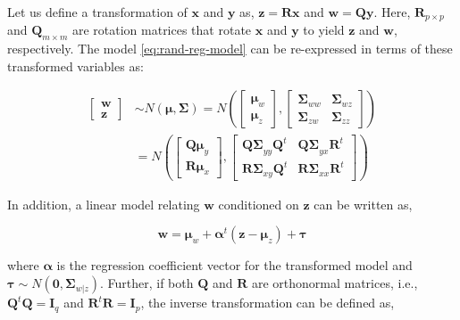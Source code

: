 \documentclass[review]{elsarticle}
\theoremstyle{definition}
\theoremstyle{definition}
\theoremstyle{definition}
\theoremstyle{remark}
\begin{document}
Let us define a transformation of \(\mathbf{x}\) and \(\mathbf{y}\) as,
\(\mathbf{z} = \mathbf{Rx}\) and \(\mathbf{w} = \mathbf{Qy}\). Here,
\(\mathbf{R}_{p\times p}\) and \(\mathbf{Q}_{m\times m}\) are rotation
matrices that rotate \(\mathbf{x}\) and \(\mathbf{y}\) to yield
\(\mathbf{z}\) and \(\mathbf{w}\), respectively. The model
\eqref{eq:rand-reg-model} can be re-expressed in terms of these
transformed variables as:

\begin{align}
  \begin{bmatrix}\mathbf{w} \\
  \mathbf{z}\end{bmatrix}  & \sim N \left(\boldsymbol{\mu}, \boldsymbol{\Sigma}\right)
  = N \left(
    \begin{bmatrix}
      \boldsymbol{\mu}_w \\ \boldsymbol{\mu}_z
    \end{bmatrix},
    \begin{bmatrix}
      \boldsymbol{\Sigma}_{ww} & \boldsymbol{\Sigma}_{wz} \\
      \boldsymbol{\Sigma}_{zw} & \boldsymbol{\Sigma}_{zz}
    \end{bmatrix} \right) \nonumber \\
  &= N \left(
    \begin{bmatrix}
      \boldsymbol{Q\mu}_y \\
      \boldsymbol{R\mu}_x
    \end{bmatrix},
    \begin{bmatrix}
      \boldsymbol{Q\Sigma}_{yy}\boldsymbol{Q}^t & \boldsymbol{Q\Sigma}_{yx}\mathbf{R}^t \\
      \boldsymbol{R\Sigma}_{xy}\boldsymbol{Q}^t & \boldsymbol{R\Sigma}_{xx}\mathbf{R}^t
    \end{bmatrix}
  \right)
  \label{eq:model3}
\end{align}

In addition, a linear model relating \(\mathbf{w}\) conditioned on
\(\mathbf{z}\) can be written as,

\begin{equation}
\mathbf{w} =  \boldsymbol{\mu}_w + \boldsymbol{\alpha}^t \left(\mathbf{z} - \boldsymbol{\mu}_z\right) + \boldsymbol{\tau}
\label{eq:latent-model}
\end{equation}

where \(\boldsymbol{\alpha}\) is the regression coefficient vector for
the transformed model and
\(\boldsymbol{\tau} \sim N\left(\mathbf{0}, \boldsymbol{\Sigma}_{w|z}\right)\).
Further, if both \(\mathbf{Q}\) and \(\mathbf{R}\) are orthonormal
matrices, i.e., \(\mathbf{Q}^t\mathbf{Q} = \mathbf{I}_q\) and
\(\mathbf{R}^t\mathbf{R} = \mathbf{I}_p\), the inverse transformation
can be defined as,
\end{document}
